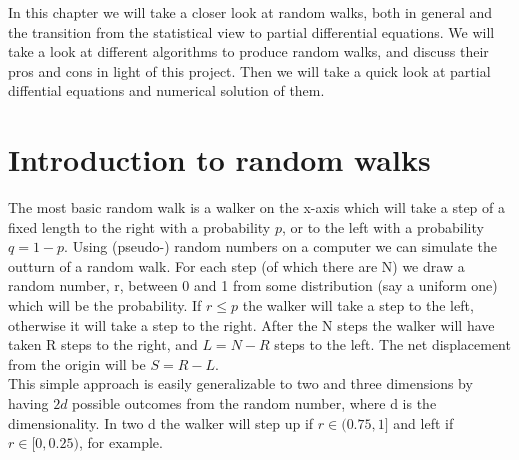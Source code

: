 
In this chapter we will take a closer look at random walks, both in general and the transition from the statistical view to partial differential equations. 
We will take a look at different algorithms to produce random walks, and discuss their pros and cons in light of this project. 
Then we will take a quick look at partial diffential equations and numerical solution of them.

\section{Introduction to random walks}\label{introduction_to_random_walks}
The most basic random walk is a walker on the x-axis which will take a step of a fixed length to the right with a probability $p$, or to the left with a probability $q=1-p$. 
Using (pseudo-) random numbers on a computer we can simulate the outturn of a random walk. 
For each step (of which there are N) we draw a random number, r, between 0 and 1 from some distribution (say a uniform one) which will be the probability. 
If $r\leq p$ the walker will take a step to the left, otherwise it will take a step to the right. 
After the N steps the walker will have taken R steps to the right, and $L = N-R$ steps to the left. 
The net displacement from the origin will be $S = R-L$. \\
This simple approach is easily generalizable to two and three dimensions by having $2d$ possible outcomes from the random number, where d is the dimensionality. 
In two d the walker will step up if $r\in(0.75,1]$ and left if $r\in[0,0.25)$, for example.

